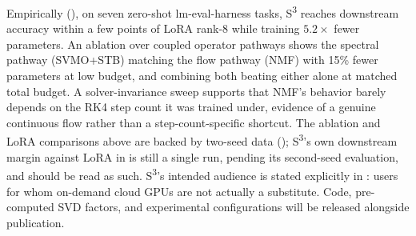 \documentclass[conference]{IEEEtran}
\newcommand{\sthree}{S\textsuperscript{3}}
\begin{document}
Empirically (), on seven zero-shot lm-eval-harness tasks, \sthree{} reaches downstream accuracy within a few points of LoRA rank-8 while training $5.2\times$ fewer parameters. An ablation over coupled operator pathways shows the spectral pathway (SVMO+STB) matching the flow pathway (NMF) with 15\% fewer parameters at low budget, and combining both beating either alone at matched total budget. A solver-invariance sweep supports that NMF's behavior barely depends on the RK4 step count it was trained under, evidence of a genuine continuous flow rather than a step-count-specific shortcut. The ablation and LoRA comparisons above are backed by two-seed data (); \sthree{}'s own downstream margin against LoRA in  is still a single run, pending its second-seed evaluation, and should be read as such. \sthree{}'s intended audience is stated explicitly in : users for whom on-demand cloud GPUs are not actually a substitute. Code, pre-computed SVD factors, and experimental configurations will be released alongside publication.
\end{document}
